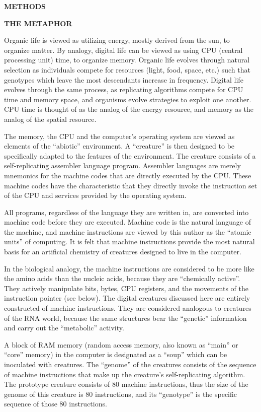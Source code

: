 \large \bf METHODS\rm \normalsize

\bf THE METAPHOR\rm
\eLP

Organic life is viewed as utilizing energy, mostly derived
from the sun, to organize matter.  By analogy, digital life can be
viewed as using CPU (central processing unit) time, to organize memory.
Organic life evolves through natural selection as individuals compete for
resources (light, food, space, etc.) such that genotypes which leave the
most descendants increase in frequency.  Digital life evolves through the
same process, as replicating algorithms compete for CPU time and memory
space, and organisms evolve strategies to exploit one another.  CPU time is
thought of as the analog of the energy resource, and memory as the analog
of the spatial resource.

The memory, the CPU and the computer's operating system are viewed as elements
of the ``abiotic'' environment.  A ``creature'' is then designed to be
specifically adapted to the features of the environment.  The creature
consists of a self-replicating assembler language program.  Assembler
languages are merely mnemonics for the machine codes that are directly
executed by the CPU.  These machine codes have the characteristic that they
directly invoke the instruction set of the CPU and services provided by the
operating system.

All programs, regardless of the language they are written in, are converted
into machine code before they are executed.  Machine code is the natural
language of the machine, and machine instructions are viewed by this
author as the ``atomic units'' of computing.  It is felt that machine
instructions provide the most natural basis for an artificial chemistry
of creatures designed to live in the computer.

In the biological analogy, the machine instructions are considered to be
more like the amino acids than the nucleic acids, because they are
``chemically active''.  They actively manipulate bits, bytes, CPU registers,
and the movements of the instruction pointer (see below).  The digital
creatures discussed here are entirely constructed of machine instructions.
They are considered analogous to creatures of the RNA world, because the
same structures bear the ``genetic'' information and carry out the
``metabolic'' activity.

A block of RAM memory (random access memory, also known as ``main'' or
``core'' memory) in the computer is designated as a ``soup'' which can
be inoculated with creatures.  The ``genome'' of the creatures consists of
the sequence of machine instructions that make up the creature's
self-replicating algorithm.  The prototype creature consists of 80 machine
instructions, thus the size of the genome of this creature is 80 instructions,
and its ``genotype'' is the specific sequence of those 80 instructions.

